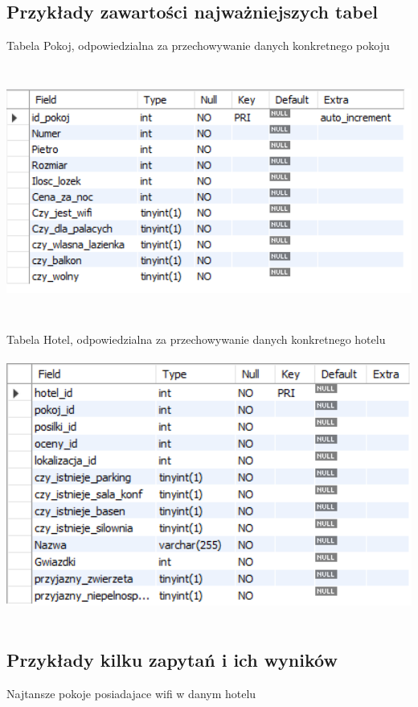 \documentclass[12pt,a4paper]{article}
\begin{document}
\subsection{Przykłady zawartości najważniejszych tabel}
Tabela Pokoj, odpowiedzialna za przechowywanie danych konkretnego pokoju
\newline
\includegraphics[angle=0,width=160mm,height=90mm]{img/tabela1.png}
\newline
Tabela Hotel, odpowiedzialna za przechowywanie danych konkretnego hotelu
\newline
\includegraphics[angle=0,width=160mm,height=90mm]{img/tabela2.png}
\subsection{Przykłady kilku zapytań i ich wyników}

Najtansze pokoje posiadajace wifi w danym hotelu
\end{document}
